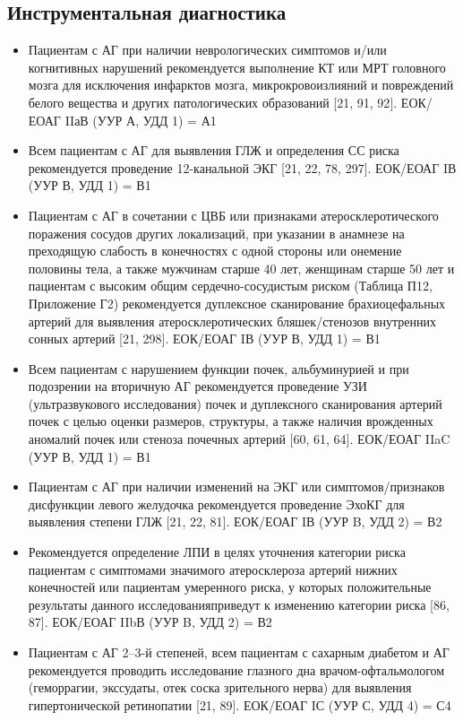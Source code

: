 \documentclass{article}%
\begin{document}
%
\subsection{Инструментальная диагностика}%
\label{subsec:}%
\begin{itemize}%
\item%
Пациентам с АГ при наличии неврологических симптомов и/или когнитивных нарушений рекомендуется выполнение КТ или МРТ головного мозга для исключения инфарктов мозга, микрокровоизлияний и повреждений белого вещества и других патологических образований {[}21, 91, 92{]}.%
\newline%
ЕОК/ЕОАГ IIаВ (УУР А, УДД 1) = А1%
\item%
Всем пациентам с АГ для выявления ГЛЖ и определения СС риска рекомендуется проведение 12{-}канальной ЭКГ {[}21, 22, 78, 297{]}.%
\newline%
ЕОК/ЕОАГ IВ (УУР В, УДД 1) = В1%
\item%
Пациентам с АГ в сочетании с ЦВБ или признаками атеросклеротического поражения сосудов других локализаций, при указании в анамнезе на преходящую слабость в конечностях с одной стороны или онемение половины тела, а также мужчинам старше 40 лет, женщинам старше 50 лет и пациентам с высоким общим сердечно{-}сосудистым риском (Таблица П12, Приложение Г2) рекомендуется дуплексное сканирование брахиоцефальных артерий для выявления атеросклеротических бляшек/стенозов внутренних сонных артерий {[}21, 298{]}.%
\newline%
ЕОК/ЕОАГ IВ (УУР В, УДД 1) = В1%
\item%
Всем пациентам с нарушением функции почек, альбуминурией и при подозрении на вторичную АГ рекомендуется проведение УЗИ (ультразвукового исследования) почек и дуплексного сканирования артерий почек с целью оценки размеров, структуры, а также наличия врожденных аномалий почек или стеноза почечных артерий {[}60, 61, 64{]}.%
\newline%
ЕОК/ЕОАГ IIaC (УУР В, УДД 1) = В1%
\item%
Пациентам с АГ при наличии изменений на ЭКГ или симптомов/признаков дисфункции левого желудочка рекомендуется проведение ЭхоКГ для выявления степени ГЛЖ {[}21, 22, 81{]}.%
\newline%
ЕОК/ЕОАГ IВ (УУР B, УДД 2) = В2%
\item%
Рекомендуется определение ЛПИ в целях уточнения категории риска пациентам с симптомами значимого атеросклероза артерий нижних конечностей или пациентам умеренного риска,  у которых положительные результаты данного исследованияприведут к изменению категории риска {[}86, 87{]}.%
\newline%
ЕОК/ЕОАГ IIbВ (УУР B, УДД 2) = В2%
\item%
Пациентам с АГ 2–3{-}й степеней, всем пациентам с сахарным диабетом и АГ рекомендуется проводить исследование глазного дна врачом{-}офтальмологом (геморрагии, экссудаты, отек соска зрительного нерва) для выявления гипертонической ретинопатии {[}21, 89{]}.%
\newline%
ЕОК/ЕОАГ IС (УУР С, УДД 4) = С4%
\end{itemize}
\end{document}
